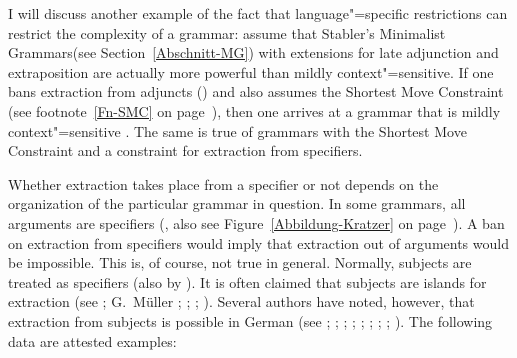 I will discuss another example of the fact that language"=specific restrictions can restrict the complexity of a grammar:
\citet[Section~3.2]{GM2007a} assume that Stabler's Minimalist Grammars\indexmg (see
Section~\ref{Abschnitt-MG}) with extensions for late adjunction and extraposition are actually more powerful than mildly context"=sensitive.
If one bans extraction from adjuncts (\citealp[]{FG2002a}) and also assumes the Shortest Move Constraint (see
footnote~\ref{Fn-SMC} on page~\pageref{Fn-SMC}), then one arrives at a grammar that is mildly context"=sensitive
\citep[]{GM2007a}.
The same is true of grammars with the Shortest Move Constraint and a constraint for extraction from specifiers.

Whether extraction takes place from a specifier or not depends on the organization of the particular grammar in question.
In some grammars, all arguments are specifiers (\citealp[--123]{Kratzer96a}, also see
Figure~\ref{Abbildung-Kratzer} on page~\pageref{Abbildung-Kratzer}). A ban on extraction from
specifiers would imply that extraction out of arguments would be impossible. This is, of course, not
true in general. Normally, subjects are treated as specifiers (also by \citealp[]{FG2002a}). It is often claimed that subjects
are islands for extraction (see \citealp[, ]{Grewendorf89a}; G.\ Müller %
\citeyear[]{GMueller96b}; \citeyear[, ]{GMueller98a};
%
\citealp[]{Sabel99a}; \citealp[]{Fanselow2001a}).
Several\label{page-extraction-out-of-subjects} authors have noted, however, that extraction from subjects is possible in German (see \citealp[]{Duerscheid89a}; \citealp*[]{Haider93a};
\citealp{Pafel93b-u}; \citealp[]{Fortmann96a-u}; \citealp[]{Suchsland97a};
\citealp[]{VS98a}; \citealp[]{Ballweg97a}; \citealp[--101]{Mueller99a}; \citealp[]{deKuthy2002a}).
The following data are attested examples:%
